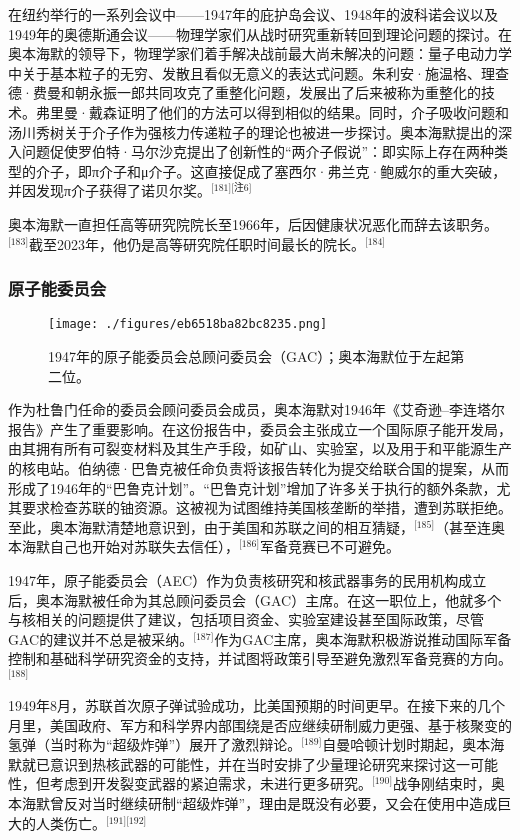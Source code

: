 在纽约举行的一系列会议中——1947年的庇护岛会议、1948年的波科诺会议以及1949年的奥德斯通会议——物理学家们从战时研究重新转回到理论问题的探讨。在奥本海默的领导下，物理学家们着手解决战前最大尚未解决的问题：量子电动力学中关于基本粒子的无穷、发散且看似无意义的表达式问题。朱利安·施温格、理查德·费曼和朝永振一郎共同攻克了重整化问题，发展出了后来被称为重整化的技术。弗里曼·戴森证明了他们的方法可以得到相似的结果。同时，介子吸收问题和汤川秀树关于介子作为强核力传递粒子的理论也被进一步探讨。奥本海默提出的深入问题促使罗伯特·马尔沙克提出了创新性的“两介子假说”：即实际上存在两种类型的介子，即π介子和μ介子。这直接促成了塞西尔·弗兰克·鲍威尔的重大突破，并因发现π介子获得了诺贝尔奖。\(^\text{[181][注6]}\)

奥本海默一直担任高等研究院院长至1966年，后因健康状况恶化而辞去该职务。\(^\text{[183]}\)截至2023年，他仍是高等研究院任职时间最长的院长。\(^\text{[184]}\)
\subsubsection{原子能委员会}
\begin{figure}[ht]
\centering
\texttt{[image: ./figures/eb6518ba82bc8235.png]}
\caption{1947年的原子能委员会总顾问委员会（GAC）；奥本海默位于左起第二位。} \label{fig_ABHM_10}
\end{figure}
作为杜鲁门任命的委员会顾问委员会成员，奥本海默对1946年《艾奇逊–李连塔尔报告》产生了重要影响。在这份报告中，委员会主张成立一个国际原子能开发局，由其拥有所有可裂变材料及其生产手段，如矿山、实验室，以及用于和平能源生产的核电站。伯纳德·巴鲁克被任命负责将该报告转化为提交给联合国的提案，从而形成了1946年的“巴鲁克计划”。“巴鲁克计划”增加了许多关于执行的额外条款，尤其要求检查苏联的铀资源。这被视为试图维持美国核垄断的举措，遭到苏联拒绝。至此，奥本海默清楚地意识到，由于美国和苏联之间的相互猜疑，\(^\text{[185]}\)（甚至连奥本海默自己也开始对苏联失去信任），\(^\text{[186]}\)军备竞赛已不可避免。

1947年，原子能委员会（AEC）作为负责核研究和核武器事务的民用机构成立后，奥本海默被任命为其总顾问委员会（GAC）主席。在这一职位上，他就多个与核相关的问题提供了建议，包括项目资金、实验室建设甚至国际政策，尽管GAC的建议并不总是被采纳。\(^\text{[187]}\)作为GAC主席，奥本海默积极游说推动国际军备控制和基础科学研究资金的支持，并试图将政策引导至避免激烈军备竞赛的方向。\(^\text{[188]}\)

1949年8月，苏联首次原子弹试验成功，比美国预期的时间更早。在接下来的几个月里，美国政府、军方和科学界内部围绕是否应继续研制威力更强、基于核聚变的氢弹（当时称为“超级炸弹”）展开了激烈辩论。\(^\text{[189]}\)自曼哈顿计划时期起，奥本海默就已意识到热核武器的可能性，并在当时安排了少量理论研究来探讨这一可能性，但考虑到开发裂变武器的紧迫需求，未进行更多研究。\(^\text{[190]}\)战争刚结束时，奥本海默曾反对当时继续研制“超级炸弹”，理由是既没有必要，又会在使用中造成巨大的人类伤亡。\(^\text{[191][192]}\)

